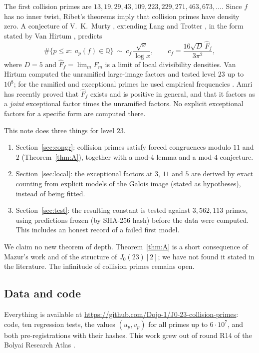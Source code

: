 \documentclass[11pt]{amsart}
\theoremstyle{definition}
\theoremstyle{remark}
\newcommand{\Q}{\mathbb{Q}}
\begin{document}
The first collision primes are $13,19,29,43,109,223,229,271,463,673,\dots$. Since $f$ has no inner twist, Ribet's theorems \cite{Ribet} imply that collision primes have density zero. A conjecture of V.~K.~Murty \cite{Murty}, extending Lang and Trotter \cite{LT}, in the form stated by Van Hirtum \cite[Conj.~1.1]{VH}, predicts
\begin{equation}\label{eq:murty}
\#\{p\le x:\ a_p(f)\in\Q\}\ \sim\ c_f\,\frac{\sqrt{x}}{\log x},
\qquad c_f=\frac{16\sqrt{D}\,\widehat F_f}{3\pi^2},
\end{equation}
where $D=5$ and $\widehat F_f=\lim_m F_m$ is a limit of local divisibility densities. Van Hirtum computed the unramified large-image factors and tested level $23$ up to $10^8$; for the ramified and exceptional primes he used empirical frequencies \cite[\S7]{VH}. Amri \cite[App.~A]{Amri} has recently proved that $\widehat F_f$ exists and is positive in general, and that it factors as a \emph{joint} exceptional factor times the unramified factors. No explicit exceptional factors for a specific form are computed there.

This note does three things for level $23$.
\begin{enumerate}
\item Section~\ref{sec:congr}: collision primes satisfy forced congruences modulo $11$ and $2$ (Theorem~\ref{thm:A}), together with a mod-$4$ lemma and a mod-$4$ conjecture.
\item Section~\ref{sec:local}: the exceptional factors at $3$, $11$ and $5$ are derived by exact counting from explicit models of the Galois image (stated as hypotheses), instead of being fitted.
\item Section~\ref{sec:test}: the resulting constant is tested against $3{,}562{,}113$ primes, using predictions frozen (by SHA-256 hash) before the data were computed. This includes an honest record of a failed first model.
\end{enumerate}
We claim no new theorem of depth. Theorem~\ref{thm:A} is a short consequence of Mazur's work and of the structure of $J_0(23)[2]$; we have not found it stated in the literature. The infinitude of collision primes remains open.

\subsection*{Data and code}
Everything is available at \url{https://github.com/Dojo-1/J0-23-collision-primes}: code, ten regression tests, the values $(u_p,v_p)$ for all primes up to $6\cdot10^7$, and both pre-registrations with their hashes. This work grew out of round R14 of the Bolyai Research Atlas \cite{Atlas}.
\end{document}
